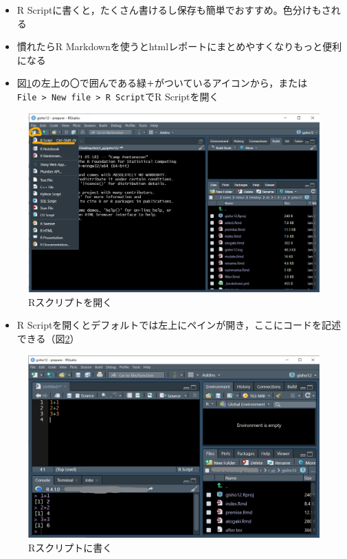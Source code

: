 \documentclass[
  xelatex,ja=standard, b5paper]{bxjsbook}
\providecommand{\tightlist}{%
  \setlength{\itemsep}{0pt}\setlength{\parskip}{0pt}}
\begin{document}
\begin{itemize}
\tightlist
\item
  R Scriptに書くと，たくさん書けるし保存も簡単でおすすめ。色分けもされる
\item
  慣れたらR Markdownを使うとhtmlレポートにまとめやすくなりもっと便利になる
\item
  図\ref{fig:script}の左上の〇で囲んである緑\texttt{＋}がついているアイコンから，または\texttt{File\ \textgreater{}\ New\ file\ \textgreater{}\ R\ Script}でR Scriptを開く
\end{itemize}

\begin{figure}

{\centering \includegraphics[width=0.7\linewidth]{images/newfile} 

}

\caption{Rスクリプトを開く}\label{fig:script}
\end{figure}

\begin{itemize}
\tightlist
\item
  R Scriptを開くとデフォルトでは左上にペインが開き，ここにコードを記述できる（図\ref{fig:script2}）
\end{itemize}

\begin{figure}

{\centering \includegraphics[width=0.7\linewidth]{images/rscript} 

}

\caption{Rスクリプトに書く}\label{fig:script2}
\end{figure}
\end{document}

